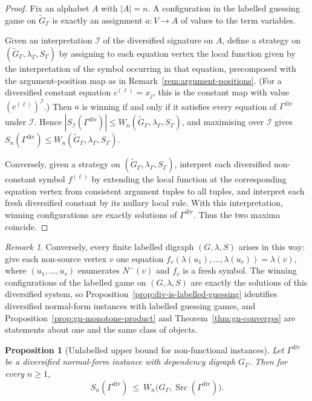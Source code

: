 \documentclass[11pt]{article}
\theoremstyle{plain}
\newtheorem{proposition}[theorem]{Proposition}
\theoremstyle{definition}
\theoremstyle{definition}
\theoremstyle{remark}
\newtheorem*{remark*}{Remark}
\newcommand{\A}{A}
\newcommand{\Sn}{S_n}
\newcommand{\abs}[1]{\left\lvert #1 \right\rvert}
\newcommand{\Src}{\operatorname{Src}}
\begin{document}
\begin{proof}
Fix an alphabet $\A$ with $|\A|=n$.
A configuration in the labelled guessing game on $\widetilde G_{\Gamma}$ is exactly an assignment
$a:V\to\A$ of values to the term variables.

Given an interpretation $\mathcal I$ of the diversified signature on $\A$, define a strategy on
$(\widetilde G_{\Gamma},\lambda_{\Gamma},S_{\Gamma})$ by assigning to each equation vertex the local function given by
the interpretation of the symbol occurring in that equation, precomposed with the argument-position map as in
Remark~\ref{rem:argument-positions}.
(For a diversified constant equation $c^{(\ell)}=x_j$, this is the constant map with value
$(c^{(\ell)})^{\mathcal I}$.)
Then $a$ is winning if and only if it satisfies every equation of $\Gamma^{\mathrm{div}}$ under $\mathcal I$.
Hence \(\abs{S_{\mathcal I}(\Gamma^{\mathrm{div}})}\le W_n(\widetilde G_{\Gamma},\lambda_{\Gamma},S_{\Gamma})\), and
maximising over $\mathcal I$ gives
\(\Sn(\Gamma^{\mathrm{div}})\le W_n(\widetilde G_{\Gamma},\lambda_{\Gamma},S_{\Gamma})\).

Conversely, given a strategy on $(\widetilde G_{\Gamma},\lambda_{\Gamma},S_{\Gamma})$, interpret each diversified
non-constant symbol $f^{(\ell)}$ by extending the local function at the corresponding equation vertex from
consistent argument tuples to all tuples, and interpret each fresh diversified constant by its nullary local rule.
With this interpretation, winning configurations are exactly solutions of $\Gamma^{\mathrm{div}}$.
Thus the two maxima coincide.
\end{proof}

\begin{remark*}
Conversely, every finite labelled digraph $(G,\lambda,S)$ arises in this way: give each
non-source vertex $v$ one equation $f_v(\lambda(u_1),\dots,\lambda(u_r))=\lambda(v)$, where
$(u_1,\dots,u_r)$ enumerates $N^-(v)$ and $f_v$ is a fresh symbol.  The winning configurations
of the labelled game on $(G,\lambda,S)$ are exactly the solutions of this diversified system,
so Proposition~\ref{prop:div-is-labelled-guessing} identifies diversified normal-form instances
with labelled guessing games, and Proposition~\ref{prop:gn-monotone-product} and
Theorem~\ref{thm:gn-converges} are statements about one and the same class of objects.
\end{remark*}

\begin{proposition}[Unlabelled upper bound for non-functional instances]
\label{prop:div-upper}
Let $\Gamma^{\mathrm{div}}$ be a diversified normal-form instance with dependency digraph $G_{\Gamma}$.
Then for every $n\ge 1$,
\[
  \Sn(\Gamma^{\mathrm{div}})\ \le\ W_n\bigl(G_{\Gamma},\Src(\Gamma^{\mathrm{div}})\bigr).
\]
\end{proposition}
\end{document}
